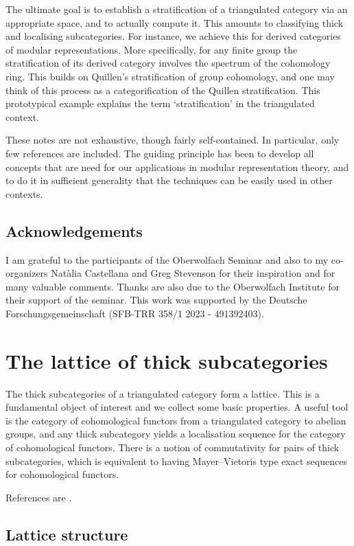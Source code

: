 \documentclass{amsart}[a4]
\theoremstyle{definition}
\theoremstyle{remark}
\numberwithin{equation}{section}
\begin{document}
The ultimate goal is to establish a stratification of a triangulated
category via an appropriate space, and to actually compute it. This
amounts to classifying thick and localising subcategories.  For
instance, we achieve this for derived categories of modular
representations. More specifically, for any finite group the
stratification of its derived category involves the spectrum of the
cohomology ring. This builds on Quillen's stratification of group
cohomology, and one may think of this process as a categorification of
the Quillen stratification. This prototypical example explains the
term `stratification' in the triangulated context.

These notes are not exhaustive, though fairly self-contained. In
particular, only few references are included. The guiding principle
has been to develop all concepts that are need for our applications in
modular representation theory, and to do it in sufficient generality
that the techniques can be easily used in other contexts.

\subsection*{Acknowledgements}
I am grateful to the participants of the Oberwolfach Seminar and also
to my co-organizers Nat\`alia Castellana and Greg Stevenson for
their inspiration and for many valuable comments. Thanks are also due to
the Oberwolfach Institute for their support of the seminar.
This work was supported by the Deutsche Forschungsgemeinschaft
(SFB-TRR 358/1 2023 - 491392403).

\section{The lattice of thick subcategories}

The thick subcategories of a triangulated category form a
lattice. This is a fundamental object of interest and we collect some
basic properties. A useful tool is the category of cohomological
functors from a triangulated category to abelian groups, and any thick
subcategory yields a localisation sequence for the category of
cohomological functors.  There is a notion of commutativity for pairs
of thick subcategories, which is equivalent to having Mayer--Vietoris
type exact sequences for cohomological functors.

References are \cite{Benson/Iyengar/Krause:2015a,Krause:2023a}.


\subsection*{Lattice structure}
\end{document}
